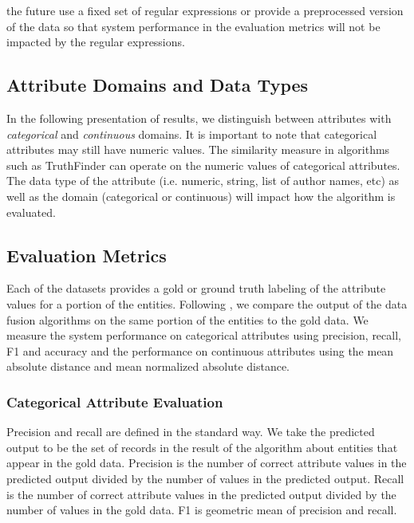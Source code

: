 \documentclass{acm_proc_article-sp}
\begin{document}
the future use a fixed set of regular expressions or provide a preprocessed version of the data so that system performance in the evaluation metrics will not be impacted by the regular expressions. 

\subsection{Attribute Domains and Data Types}

In the following presentation of results, we distinguish between attributes with  \emph{categorical} and \emph{continuous} domains. It is important to note that categorical attributes may still have numeric values. The similarity measure in algorithms such as {\sc TruthFinder} can operate on the numeric values of categorical attributes. The data type of the attribute (i.e. numeric, string, list of author names, etc) as well as the domain (categorical or continuous) will impact how the algorithm is evaluated. 

\subsection{Evaluation Metrics}

Each of the datasets provides a gold or ground truth labeling of the attribute values for a portion of the entities. Following \cite{li:truth,li:resolving,waguih:truth,dong:integrating}, we compare the output of the data fusion algorithms on the same portion of the entities to the gold data. We measure the system performance on categorical attributes using precision, recall, F1 and accuracy and the performance on continuous attributes using  the mean absolute distance and mean normalized absolute distance. 

\subsubsection{Categorical Attribute Evaluation}

Precision and recall are defined in the standard way. We take the predicted output to be the set of records in the result of the algorithm about entities  that appear in the gold data. Precision is the number of correct attribute values in the predicted output divided by the number of values in the predicted output. Recall is the number of correct attribute values in the predicted output divided by the number of values in the gold data. F1 is  geometric mean of precision and recall. 
\end{document}

